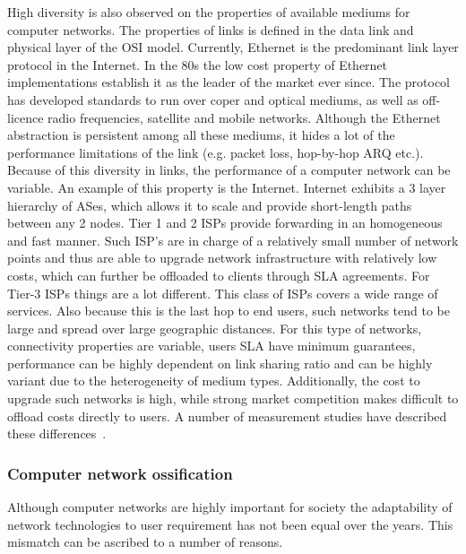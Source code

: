 High diversity is also observed on the properties of available mediums for
computer networks. The properties of links is defined in the data link and
physical layer of the OSI model. Currently, Ethernet is the predominant link
layer protocol in the Internet. In the 80s the low cost property of Ethernet
implementations establish it as the leader of the market ever since.  The
protocol has developed standards to run over coper and optical mediums, as well
as off-licence radio frequencies, satellite and mobile networks. Although the
Ethernet abstraction is persistent among all these mediums, it hides a lot of
the performance limitations of the link (e.g. packet loss, hop-by-hop ARQ etc.).
Because of this diversity in links, the performance of a computer network can be
variable. An example of this property is the Internet. Internet exhibits a 3
layer hierarchy of ASes, which allows it to scale and provide short-length paths
between any 2 nodes.  Tier 1 and 2 ISPs provide forwarding in an homogeneous and
fast manner. Such ISP's are in charge of a relatively small number of network
points and thus are able to upgrade network infrastructure with relatively low costs,
which can further be offloaded to clients through SLA agreements. For Tier-3 ISPs things
are a lot different. This class of ISPs covers a wide range of services. Also
because this is the last hop to end users, such networks tend to be large and
spread over large geographic distances. For this type of networks, connectivity
properties are variable, users SLA have minimum guarantees, performance can be
highly dependent on link sharing ratio and can be highly variant
due to the heterogeneity of medium types. Additionally, the cost to upgrade such
networks is high, while strong market competition makes difficult to offload
costs directly to users. A number of measurement studies have
described these differences~\cite{Huang:2010wb,Dischinger:2007bg}. 

\subsubsection{Computer network ossification}

Although computer networks are highly important for society the adaptability of
network technologies to user requirement has not been equal over the years. This
mismatch can be ascribed to a number of reasons. 

